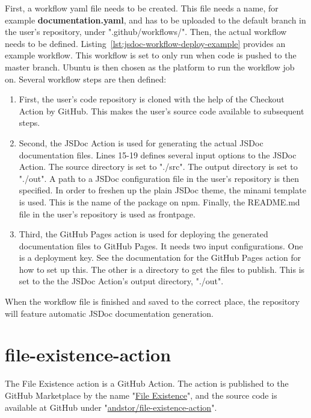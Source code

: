 First, a workflow yaml file needs to be created. This file needs a name, for example \textbf{documentation.yaml}, and has to be uploaded to the default branch in the user's repository, under ".github/workflows/". Then, the actual workflow needs to be defined. Listing~\ref{lst:jsdoc-workflow-deploy-example} provides an example workflow. This workflow is set to only run when code is pushed to the master branch. Ubuntu is then chosen as the platform to run the workflow job on. Several workflow steps are then defined:
\begin{enumerate}
    \item First, the user's code repository is cloned with the help of the Checkout Action by GitHub. This makes the user's source code available to subsequent steps. 
    \item Second, the JSDoc Action is used for generating the actual JSDoc documentation files. Lines 15-19 defines several input options to the JSDoc Action. The source directory is set to "./src". The output directory is set to "./out". A path to a JSDoc configuration file in the user's repository is then specified. In order to freshen up the plain JSDoc theme, the minami template is used. This is the name of the package on npm. Finally, the README.md file in the user's repository is used as frontpage. 
    \item Third, the GitHub Pages action is used for deploying the generated documentation files to GitHub Pages. It needs two input configurations. One is a deployment key. See the documentation for the GitHub Pages action for how to set up this. The other is a directory to get the files to publish. This is set to the the JSDoc Action's output directory, "./out".
\end{enumerate}
When the workflow file is finished and saved to the correct place, the repository will feature automatic JSDoc documentation generation.

\clearpage


\section{file-existence-action}
The File Existence action is a GitHub Action. The action is published to the GitHub Marketplace by the name "\href{https://github.com/marketplace/actions/file-existence}{File Existence}", and the source code is available at GitHub under "\href{https://github.com/andstor/file-existence-action}{andstor/file-existence-action}".


